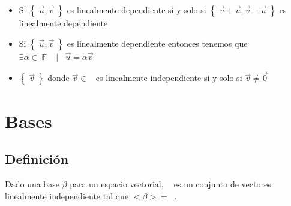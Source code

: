 \documentclass[12pt, fleqn]{report}                             %
\newenvironment{SmallIndentation}[1][0.75em]                    %
        {\begin{adjustwidth}{#1}{}\begin{footnotesize}}             %
        {\end{footnotesize}\end{adjustwidth}}                       %
\DeclareMathOperator \Space {\quad}                             %
\DeclareMathOperator \MiniSpace {\;}                            %
\newcommand \Such {\MiniSpace | \MiniSpace}                     %
\theoremstyle{break}                                            %
\DeclareMathOperator \GenericField {\mathbb{F}}                 %
\DeclareMathOperator \VectorSet    {\mathbb{V}}                 %
\DeclareMathOperator \VectorSpace  {\VectorSet_{\GenericField}} %
\newcommand{\Set}[1]    {\left\{ \; #1 \; \right\}}             %
\begin{document}
\begin{itemize}
\begin{SmallIndentation}[1em]
                        Por lo tanto podemos dividir todo entre $k$ y despejar y decir que:
                        $\vec v = \sum_{i=0}^n \frac{a_i}{k} \vec v_i$ entonces ya vimos que podemos
                        escribir a $\vec v$ como combinación lineal de elementos de $S$ entonces
                        pertenece al generado de $S$.

                        Y bueno, el regreso es lo mismo n.n
                    
                    \end{SmallIndentation}
                        

                \item 
                    Si $\Set{ \vec u, \vec v}$ es linealmente dependiente si y solo si
                    $\Set{\vec v + \vec u, \vec v - \vec u}$ es linealmente dependiente

                \item
                    Si $\Set{ \vec u, \vec v}$ es linealmente dependiente entonces
                    tenemos que $\exists \alpha \in \GenericField \Such \vec u = \alpha \vec v$

                \item $\Set{\vec v}$ donde $\vec v \in \VectorSpace$ es linealmente independiente si 
                y solo si $\vec v \neq \vec 0$

            \end{itemize}


        \clearpage
        \section{Bases}


            \subsection{Definición}

                Dado una base $\beta$ para un espacio vectorial, $\VectorSpace$ es un conjunto
                de vectores linealmente independiente tal que $<\beta> = \VectorSpace$.
\end{document}
